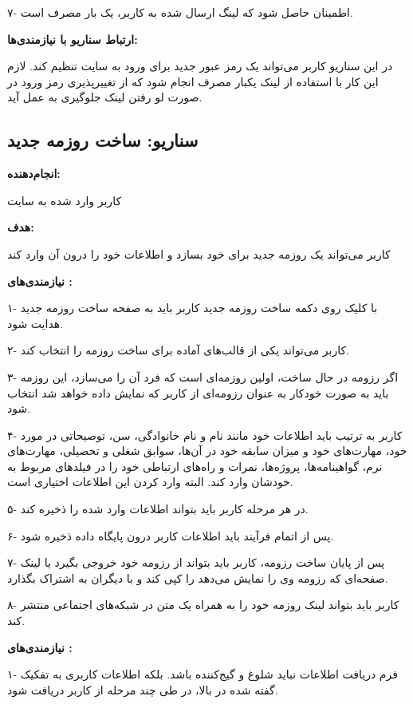 \documentclass[]{article}
\begin{document}
	۷- اطمینان حاصل شود که لینگ ارسال شده به کاربر، یک بار مصرف است.
	
	\textbf{ارتباط سناریو با نیازمندی‌ها:}
	
	
	در این سناریو کاربر می‌تواند یک رمز عبور جدید برای ورود به سایت تنظیم کند. لازم این کار با استفاده از لینک یکبار مصرف انجام شود که از تغییرپذیری رمز ورود در صورت لو رفتن لینک جلوگیری به عمل آید.
	
	
	\subsection{\LARGE{سناریو: ساخت روزمه جدید}}
	
	\textbf{انجام‌دهنده:}
	
	کاربر وارد شده به سایت
	
	\textbf{هدف:}
	
	کاربر می‌تواند یک روزمه جدید برای خود بسازد و اطلاعات خود را درون آن وارد کند
	
	\textbf{نیازمندی‌های :} 
	
	۱- با کلیک روی دکمه ساخت روزمه جدید کاربر باید به صفحه ساخت روزمه جدید هدایت شود.
	
	۲- کاربر می‌تواند یکی از قالب‌های آماده برای ساخت روزمه را انتخاب کند.
	
	۳- اگر رزومه در حال ساخت، اولین روزمه‌ای است که فرد آن را می‌سازد، این روزمه باید به صورت خودکار به عنوان رزومه‌ای از کاربر که نمایش داده‌ خواهد شد انتخاب شود.
	
	۴- کاربر به ترتیب باید اطلاعات خود مانند نام و نام خانوادگی، سن، توصیحاتی در مورد خود، مهارت‌های خود و میزان سابقه خود در آن‌ها، سوابق شغلی و تحصیلی، مهارت‌های نرم، گواهینامه‌ها، پروژه‌ها، نمرات و راه‌های ارتباطی خود را در فیلد‌های مربوط به خودشان وارد کند. البته وارد کردن این اطلاعات اختیاری است.
	
	۵- در هر مرحله کاربر باید بتواند اطلاعات وارد شده را ذخیره کند.
	
	۶- پس از اتمام فرآیند باید اطلاعات کاربر درون پایگاه داده ذخیره شود.
	
	۷- پس از پایان ساخت رزومه، کاربر باید بتواند از رزومه خود خروجی  بگیرد یا لینک صفحه‌ای که رزومه وی را نمایش می‌دهد را کپی کند و با دیگران به اشتراک بگذارد.
	
	۸- کاربر باید بتواند لینک روزمه خود را به همراه یک متن در شبکه‌های اجتماعی منتشر کند.
	
	\textbf{نیازمندی‌های :}
	
	۱- فرم دریافت اطلاعات نباید شلوغ و گیج‌کننده باشد. بلکه اطلاعات کاربری به تفکیک گفته شده در بالا، در طی چند مرحله از کاربر دریافت شود.
	
\end{document}
